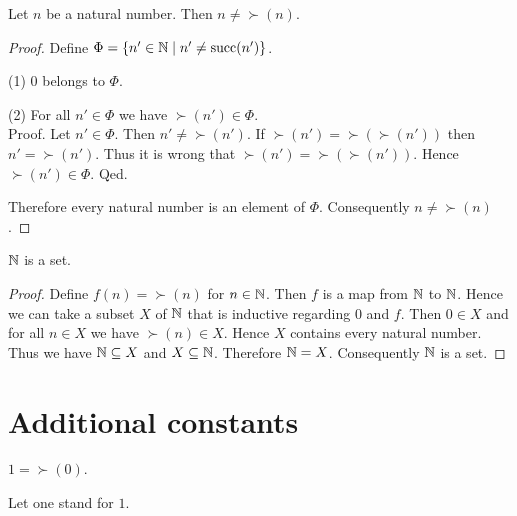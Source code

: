 \documentclass[../arithmetic.tex]{subfiles}
\begin{document}
  \begin{forthel}
    \begin{proposition}
      Let $n$ be a natural number.
      Then $n \neq \succ(n)$.
    \end{proposition}
    \begin{proof}
      Define $\Phi = \{ n' \in \mathbb{N} \mid n' \neq \operatorname{succ}(n') \}$.

      (1) $0$ belongs to $\Phi$.

      (2) For all $n' \in \Phi$ we have $\succ(n') \in \Phi$. \\
      Proof.
        Let $n' \in \Phi$.
        Then $n' \neq \succ(n')$.
        If $\succ(n') = \succ(\succ(n'))$ then $n' = \succ(n')$.
        Thus it is wrong that $\succ(n') = \succ(\succ(n'))$.
        Hence $\succ(n') \in \Phi$.
      Qed.

      Therefore every natural number is an element of $\Phi$.
      Consequently $n \neq \succ(n)$.
    \end{proof}
  \end{forthel}

  \begin{forthel}
    \begin{proposition}
      $\mathbb{N}$ is a set.
    \end{proposition}
    \begin{proof}
      Define $f(n) = \succ(n)$ for $n \in \mathbb{N}$.
      Then $f$ is a map from $\mathbb{N}$ to $\mathbb{N}$.
      Hence we can take a subset $X$ of $\mathbb{N}$ that is inductive regarding
      $0$ and $f$.
      Then $0 \in X$ and for all $n \in X$ we have $\succ(n) \in X$.
      Hence $X$ contains every natural number.
      Thus we have $\mathbb{N} \subseteq X$ and $X \subseteq \mathbb{N}$.
      Therefore $\mathbb{N} = X$.
      Consequently $\mathbb{N}$ is a set.
    \end{proof}
  \end{forthel}


  \section{Additional constants}

  \begin{forthel}
    \begin{definition}
      $1 = \succ(0)$.
    \end{definition}

    Let one stand for $1$.
  \end{forthel}
\end{document}
